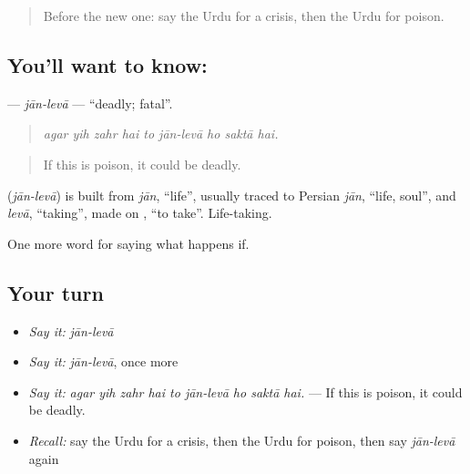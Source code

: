 \begin{quote}
Before the new one: say the Urdu for a crisis, then the Urdu for poison.
\end{quote}

\subsection*{You'll want to know:  }
\textbf{ } — \emph{jān-levā} — \textquotedblleft{}deadly; fatal\textquotedblright{}.

\begin{quote}
         
\end{quote}

\begin{quote}
\emph{agar yih zahr hai to jān-levā ho saktā hai.}
\end{quote}

\begin{quote}
If this is poison, it could be deadly.
\end{quote}

\begin{cousinweb}
\textbf{ } (\emph{jān-levā}) is built from \emph{jān}, \textquotedblleft{}life\textquotedblright{}, usually traced to Persian \emph{jān}, \textquotedblleft{}life, soul\textquotedblright{}, and \emph{levā}, \textquotedblleft{}taking\textquotedblright{}, made on \textbf{}, \textquotedblleft{}to take\textquotedblright{}. Life-taking.
\end{cousinweb}

\begin{grammarlens}[title={What you've built}]
One more word for saying what happens if.
\end{grammarlens}

\subsection*{Your turn}
\begin{itemize}
\raggedright
  \item \emph{Say it:} \emph{jān-levā}
  \item \emph{Say it:} \emph{jān-levā}, once more
  \item \emph{Say it:} \emph{agar yih zahr hai to jān-levā ho saktā hai.} — If this is poison, it could be deadly.
  \item \emph{Recall:} say the Urdu for a crisis, then the Urdu for poison, then say \emph{jān-levā} again
\end{itemize}

